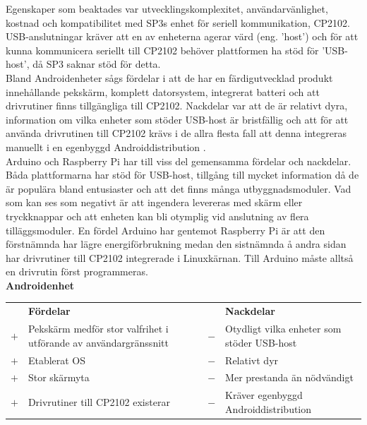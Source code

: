 \documentclass{article}
\begin{document}
            \noindent Egenskaper som beaktades var utvecklingskomplexitet, användarvänlighet, kostnad och kompatibilitet med SP3s enhet för seriell kommunikation, CP2102. USB-anslutningar kräver att en av enheterna agerar värd (eng. 'host') och för att kunna kommunicera seriellt till CP2102 behöver plattformen ha stöd för 'USB-host', då SP3 saknar stöd för detta. \\
            
            \noindent Bland Androidenheter sågs fördelar i att de har en färdigutvecklad produkt innehållande pekskärm, komplett datorsystem, integrerat batteri och att drivrutiner finns tillgängliga till CP2102. Nackdelar var att de är relativt dyra, information om vilka enheter som stöder USB-host är bristfällig och att för att använda drivrutinen till CP2102 krävs i de allra flesta fall att denna integreras manuellt i en egenbyggd Androiddistribution \cite{SL_AN809}. \\
            
            \noindent Arduino och Raspberry Pi har till viss del gemensamma fördelar och nackdelar. Båda plattformarna har stöd för USB-host, tillgång till mycket information då de är populära bland entusiaster och att det finns många utbyggnadsmoduler. Vad som kan ses som negativt är att ingendera levereras med skärm eller tryckknappar och att enheten kan bli otymplig vid anslutning av flera tilläggsmoduler. En fördel Arduino har gentemot Raspberry Pi är att den förstnämnda har lägre energiförbrukning medan den sistnämnda å andra sidan har drivrutiner till CP2102 integrerade i Linuxkärnan. Till Arduino måste alltså en drivrutin först programmeras. \\


            \noindent\textsf{\textbf{Androidenhet}}\\
            \begin{tabularx}{\textwidth}{@{}cXcX}
                & \textbf{Fördelar}     & & \textbf{Nackdelar} \\
                $+$ & Pekskärm medför stor valfrihet i utförande av användargränssnitt     &                            $-$ & Otydligt vilka enheter som
                                                  stöder USB-host \\
                $+$ &  Etablerat OS     &   $-$ & Relativt dyr \\
                $+$ &  Stor skärmyta    &   $-$ & Mer prestanda än nödvändigt \\
                $+$ &  Drivrutiner till CP2102 existerar &
                                            $-$ & Kräver egenbyggd Androiddistribution \\
            \end{tabularx}\\
\end{document}
